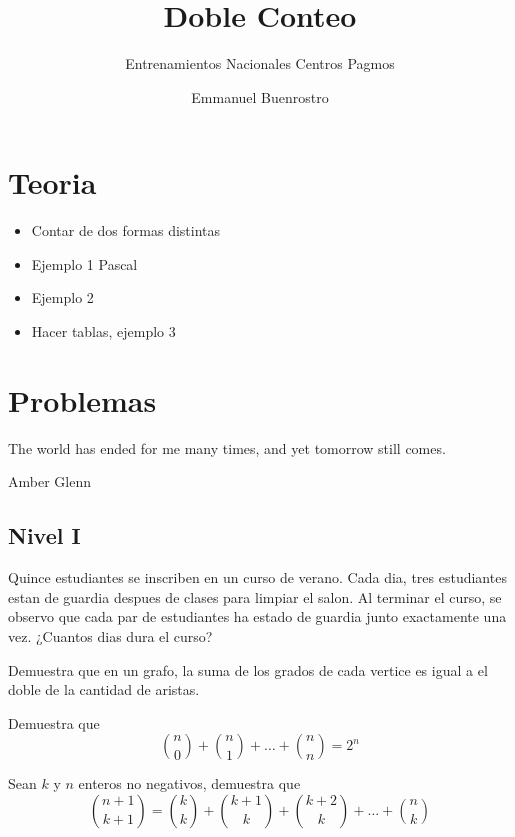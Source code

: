 \documentclass[11pt]{scrartcl}
\title {Doble Conteo}
\subtitle {Entrenamientos Nacionales Centros Pagmos}
\author{Emmanuel Buenrostro}
\begin{document}
\maketitle

\section{Teoria}
\begin{itemize}
    \item Contar de dos formas distintas
    \item Ejemplo 1 Pascal 
    \item Ejemplo 2
    \item Hacer tablas, ejemplo 3
\end{itemize}

\section{Problemas }
\epigraph{The world has ended for me many times, and yet tomorrow still comes.}{Amber Glenn}

\subsection{Nivel I}


\begin{problem} %
    Quince estudiantes se inscriben en un curso de verano. Cada dia, tres estudiantes estan de guardia despues de clases para limpiar el salon. Al terminar el curso, se observo que cada par de estudiantes ha estado de guardia junto exactamente una vez. ¿Cuantos dias dura el curso?
\end{problem}

\begin{problem} %
    Demuestra que en un grafo, la suma de los grados de cada vertice es igual a el doble de la cantidad de aristas.
\end{problem}

\begin{problem}
    Demuestra que 
    \[\binom{n}{0}+\binom{n}{1}+\ldots+\binom{n}{n}=2^n\]
\end{problem}

\begin{problem} %
    Sean $k$ y $n$ enteros no negativos, demuestra que  
    \[\binom{n+1}{k+1}=\binom{k}{k}+\binom{k+1}{k}+\binom{k+2}{k}+\ldots +\binom{n}{k}\]
\end{problem}
\end{document}
